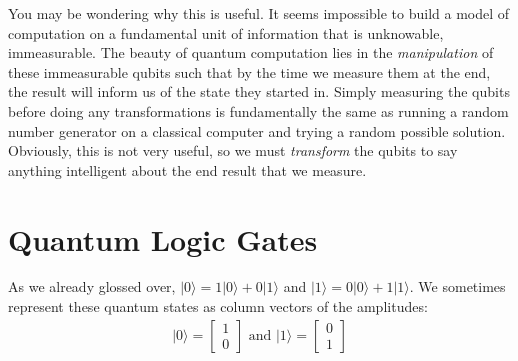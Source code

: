 \documentclass[12pt,twoside]{reedthesis}
\newcommand{\ketz}{\ensuremath{\lvert 0\rangle}\xspace}
\newcommand{\keto}{\ensuremath{\lvert 1\rangle}\xspace}
\begin{document}
You may be wondering why this is useful. It seems impossible to build a model of computation on a fundamental unit of information that is unknowable, immeasurable. The beauty of quantum computation lies in the \textit{manipulation} of these immeasurable qubits such that by the time we measure them at the end, the result will inform us of the state they started in. Simply measuring the qubits before doing any transformations is fundamentally the same as  running a random number generator on a classical computer and trying a random possible solution. Obviously, this is not very useful, so we must \textit{transform} the qubits to say anything intelligent about the end result that we measure.

\section{Quantum Logic Gates}

As we already glossed over, $\ketz = 1 \ketz + 0  \keto$ and $\keto = 0 \ketz + 1 \keto$. We sometimes represent these quantum states as column vectors of the amplitudes: 
\begin{align*}
\ketz = \begin{bmatrix}
1\\
0
\end{bmatrix}
\text{ and }
\keto = \begin{bmatrix}
0\\
1
\end{bmatrix}
\end{align*}
\end{document}
